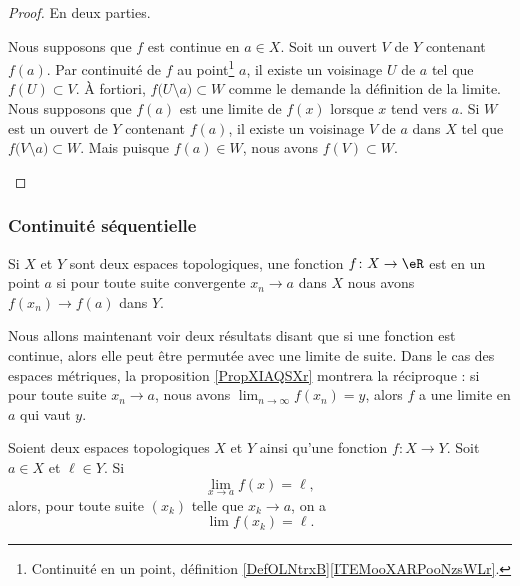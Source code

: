 \begin{proof}
	En deux parties.
	\begin{subproof}
		\spitem[\( \Rightarrow\)]
		Nous supposons que \( f\) est continue en \( a\in X\). Soit un ouvert \( V\) de \( Y\) contenant \( f(a)\). Par continuité de \( f\) au point\footnote{Continuité en un point, définition \ref{DefOLNtrxB}\ref{ITEMooXARPooNzsWLr}.} \( a\), il existe un voisinage \( U\) de \( a\) tel que \( f(U)\subset V\). À fortiori, \( f\big( U\setminus{{a}} \big)\subset W\) comme le demande la définition de la limite.
		\spitem[\( \Leftarrow\)]
		Nous supposons que \( f(a)\) est une limite de \( f(x)\) lorsque \( x\) tend vers \( a\). Si \( W\) est un ouvert de \( Y\) contenant \( f(a)\), il existe un voisinage \( V\) de \( a\) dans \( X\) tel que \( f\big( V\setminus{{a}} \big)\subset W\). Mais puisque \( f(a)\in W\), nous avons \( f(V)\subset W\).
	\end{subproof}
\end{proof}

\subsubsection{Continuité séquentielle}

\begin{definition}  \label{DefENioICV}
	Si \( X\) et \( Y \) sont deux espaces topologiques, une fonction \( f\colon X\to \eR\) est  en un point \( a\) si pour toute suite convergente \( x_n\to a\) dans \( X\) nous avons \( f(x_n)\to f(a)\) dans \( Y\).
\end{definition}

\begin{normaltext}
	Nous allons maintenant voir deux résultats disant que si une fonction est continue, alors elle peut être permutée avec une limite de suite. Dans le cas des espaces métriques, la proposition \ref{PropXIAQSXr} montrera la réciproque : si pour toute suite \(x_n\to a\), nous avons \( \lim_{n\to \infty} f(x_n)=y\), alors \( f\) a une limite en \( a\) qui vaut \( y\).
\end{normaltext}

\begin{proposition} \label{fContEstSeqCont}
	Soient deux espaces topologiques \( X\) et \( Y\) ainsi qu'une fonction \( f\colon X\to Y\). Soit \( a\in X\) et \( \ell\in Y\). Si
	\begin{equation}
		\lim_{x\to a} f(x)=\ell,
	\end{equation}
	alors, pour toute suite \( (x_k) \) telle que \( x_k \to a \), on a
	\begin{equation}
		\lim f(x_k)=\ell.
	\end{equation}
\end{proposition}

